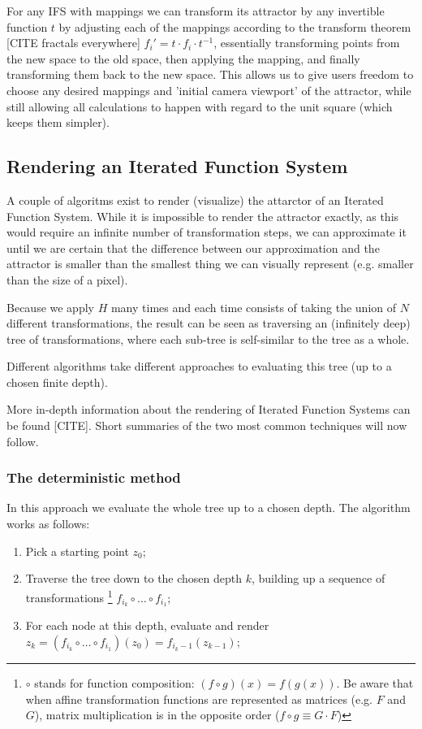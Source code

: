 \documentclass[11pt]{article}
\begin{document}
For any IFS with mappings we can transform its attractor by any invertible function \(t\) by adjusting each of the mappings according to the
transform theorem [CITE fractals everywhere] \(f_i' = t \cdot f_i \cdot t^{-1}\), essentially transforming points from the new space to the old space, then applying the mapping, and finally transforming them back to the new space. 
This allows us to give users freedom to choose any desired mappings and 'initial camera viewport' of the attractor,
while still allowing all calculations to happen with regard to the unit square (which keeps them simpler).

\subsection{Rendering an Iterated Function System}
\label{sec:org9edaaea}

A couple of algoritms exist to render (visualize) the attarctor of an Iterated Function System. 
While it is impossible to render the attractor exactly, as this would require an infinite number of transformation steps,
we can approximate it until we are certain that the difference between our approximation and the attractor is smaller than
the smallest thing we can visually represent (e.g. smaller than the size of a pixel).

Because we apply \(H\) many times and each time consists of taking the union of \(N\) different transformations,
the result can be seen as traversing an (infinitely deep) tree of transformations, 
where each sub-tree is self-similar to the tree as a whole.

Different algorithms take different approaches to evaluating this tree (up to a chosen finite depth).

More in-depth information about the rendering of Iterated Function Systems can be found [CITE]. 
Short summaries of the two most common techniques will now follow.



\subsubsection{The deterministic method}
\label{sec:orgf36cb96}

In this approach we evaluate the whole tree up to a chosen depth. The algorithm works as follows:

\begin{enumerate}
\item Pick a starting point \(z_0\);
\item Traverse the tree down to the chosen depth \(k\), building up a sequence of transformations \footnote{\(\circ\) stands for function composition: \((f \circ g)(x) = f(g(x))\). 
Be aware that when affine transformation functions are represented as matrices (e.g. \(F\) and \(G\)), matrix multiplication is in the opposite order (\(f \circ g \equiv G \cdot F\))}
\(f_{i_k} \circ \ldots \circ f_{i_1}\);
\item For each node at this depth, evaluate and render \(z_k = (f_{i_k} \circ \ldots \circ f_{i_1})(z_0) = f_{i_k-1}(z_{k-1})\);
\end{enumerate}
\end{document}
